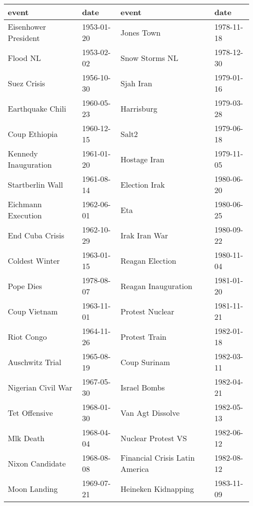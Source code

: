 \begin{tabular}{llll}
\toprule
                event &        date &                           event &        date \\
\midrule
 Eisenhower President &  1953-01-20 &                      Jones Town &  1978-11-18 \\
             Flood NL &  1953-02-02 &                  Snow Storms NL &  1978-12-30 \\
          Suez Crisis &  1956-10-30 &                       Sjah Iran &  1979-01-16 \\
     Earthquake Chili &  1960-05-23 &                      Harrisburg &  1979-03-28 \\
        Coup Ethiopia &  1960-12-15 &                           Salt2 &  1979-06-18 \\
 Kennedy Inauguration &  1961-01-20 &                    Hostage Iran &  1979-11-05 \\
     Startberlin Wall &  1961-08-14 &                   Election Irak &  1980-06-20 \\
   Eichmann Execution &  1962-06-01 &                             Eta &  1980-06-25 \\
      End Cuba Crisis &  1962-10-29 &                   Irak Iran War &  1980-09-22 \\
       Coldest Winter &  1963-01-15 &                 Reagan Election &  1980-11-04 \\
            Pope Dies &  1978-08-07 &             Reagan Inauguration &  1981-01-20 \\
         Coup Vietnam &  1963-11-01 &                 Protest Nuclear &  1981-11-21 \\
           Riot Congo &  1964-11-26 &                   Protest Train &  1982-01-18 \\
      Auschwitz Trial &  1965-08-19 &                    Coup Surinam &  1982-03-11 \\
   Nigerian Civil War &  1967-05-30 &                    Israel Bombs &  1982-04-21 \\
        Tet Offensive &  1968-01-30 &                Van Agt Dissolve &  1982-05-13 \\
            Mlk Death &  1968-04-04 &              Nuclear Protest VS &  1982-06-12 \\
      Nixon Candidate &  1968-08-08 &  Financial Crisis Latin America &  1982-08-12 \\
         Moon Landing &  1969-07-21 &             Heineken Kidnapping &  1983-11-09 \\

\end{tabular}
